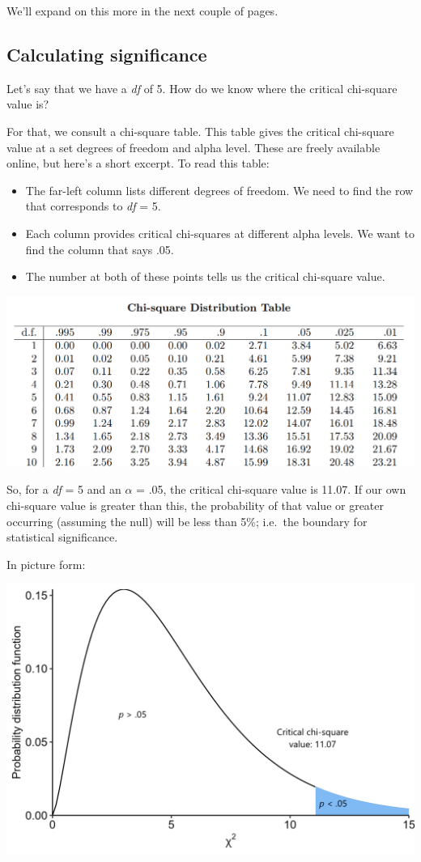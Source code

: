 \documentclass[
]{book}
\providecommand{\tightlist}{%
  \setlength{\itemsep}{0pt}\setlength{\parskip}{0pt}}
\begin{document}
We'll expand on this more in the next couple of pages.

\subsection{Calculating significance}\label{calculating-significance}

Let's say that we have a \emph{df} of 5. How do we know where the critical chi-square value is?

For that, we consult a chi-square table. This table gives the critical chi-square value at a set degrees of freedom and alpha level. These are freely available online, but here's a short excerpt. To read this table:

\begin{itemize}
\tightlist
\item
  The far-left column lists different degrees of freedom. We need to find the row that corresponds to \emph{df} = 5.
\item
  Each column provides critical chi-squares at different alpha levels. We want to find the column that says .05.
\item
  The number at both of these points tells us the critical chi-square value.
\end{itemize}

\includegraphics{img/w7_chisq_table.png}

So, for a \emph{df} = 5 and an \(\alpha\) = .05, the critical chi-square value is 11.07. If our own chi-square value is greater than this, the probability of that value or greater occurring (assuming the null) will be less than 5\%; i.e.~the boundary for statistical significance.

In picture form:

\includegraphics{img/w7_chisq_df_5.png}
\end{document}
